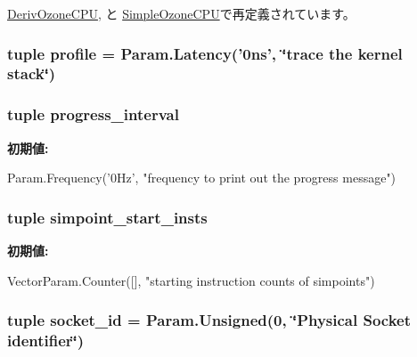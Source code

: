 \hyperlink{classOzoneCPU_1_1DerivOzoneCPU_aac03a586f9fcb28bcbe8c3721888fa93}{DerivOzoneCPU}, と \hyperlink{classSimpleOzoneCPU_1_1SimpleOzoneCPU_aac03a586f9fcb28bcbe8c3721888fa93}{SimpleOzoneCPU}で再定義されています。\hypertarget{classBaseCPU_a02161747f06d401b8553ce7a53854005}{
\subsubsection[{profile}]{\setlength{\rightskip}{0pt plus 5cm}tuple {\bf profile} = Param.Latency('0ns', \char`\"{}trace the kernel stack\char`\"{})}}
\label{classBaseCPU_a02161747f06d401b8553ce7a53854005}
\hypertarget{classBaseCPU_a1446cbc3c813038b4583bfa7ee8cab43}{
\subsubsection[{progress\_\-interval}]{\setlength{\rightskip}{0pt plus 5cm}tuple {\bf progress\_\-interval}}}
\label{classBaseCPU_a1446cbc3c813038b4583bfa7ee8cab43}
{\bfseries 初期値:}
\begin{DoxyCode}
Param.Frequency('0Hz',
        "frequency to print out the progress message")
\end{DoxyCode}
\hypertarget{classBaseCPU_a30fe1902651549f6e2fe15e9e1431614}{
\subsubsection[{simpoint\_\-start\_\-insts}]{\setlength{\rightskip}{0pt plus 5cm}tuple {\bf simpoint\_\-start\_\-insts}}}
\label{classBaseCPU_a30fe1902651549f6e2fe15e9e1431614}
{\bfseries 初期値:}
\begin{DoxyCode}
VectorParam.Counter([],
        "starting instruction counts of simpoints")
\end{DoxyCode}
\hypertarget{classBaseCPU_a15fdecad084e8c7e04ac559e4636c87d}{
\subsubsection[{socket\_\-id}]{\setlength{\rightskip}{0pt plus 5cm}tuple {\bf socket\_\-id} = Param.Unsigned(0, \char`\"{}Physical Socket identifier\char`\"{})}}
